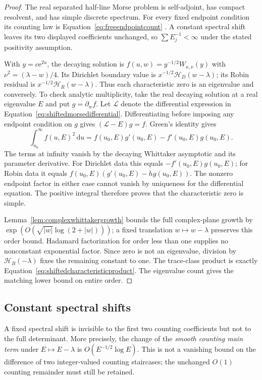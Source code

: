 \documentclass[11pt,letterpaper]{article}
\numberwithin{equation}{section}
\theoremstyle{definition}
\theoremstyle{remark}
\newcommand{\dd}{\,\mathrm d}
\newcommand{\e}{\mathrm e}
\begin{document}
\begin{proof}
The real separated half-line Morse problem is self-adjoint, has compact resolvent, and has simple discrete spectrum. For every fixed endpoint condition its counting law is Equation~\eqref{eq:freeendpointcount} \cite[Theorems~2.1 and 3.2]{lagarias}. A constant spectral shift leaves its two displayed coefficients unchanged, so $\sum E_j^{-1}<\infty$ under the stated positivity assumption.

With $y=c\e^{2u}$, the decaying solution is
$f(u,w)=y^{-1/2}W_{\kappa,\nu}(y)$ with $\nu^2=(\lambda-w)/4$.
Its Dirichlet boundary value is $x^{-1/2}\mathcal H_D(w-\lambda)$; its Robin residual is
$x^{-1/2}\mathcal H_R(w-\lambda)$. Thus each characteristic zero is an eigenvalue and conversely. To check analytic multiplicity, take the real decaying solution at a real eigenvalue $E$ and put $g=\partial_w f$. Let $\mathcal L$ denote the differential expression in Equation~\eqref{eq:shiftedmorsedifferential}. Differentiating before imposing any endpoint condition on $g$ gives $(\mathcal L-E)g=f$. Green's identity gives
\begin{equation}
 \int_{u_0}^{\infty} f(u,E)^2\dd u
 = f(u_0,E)g'(u_0,E)-f'(u_0,E)g(u_0,E).
 \label{eq:robinmultiplicity}
\end{equation}
The terms at infinity vanish by the decaying Whittaker asymptotic and its parameter derivative. For Dirichlet data this equals $-f'(u_0,E)g(u_0,E)$; for Robin data it equals $f(u_0,E)(g'(u_0,E)-hg(u_0,E))$. The nonzero endpoint factor in either case cannot vanish by uniqueness for the differential equation. The positive integral therefore proves that the characteristic zero is simple.

Lemma~\ref{lem:complexwhittakergrowth} bounds the full complex-plane growth by
$\exp(O(\sqrt{|w|}\log(2+|w|)))$; a fixed translation $w\mapsto w-\lambda$ preserves this order bound. Hadamard factorization for order less than one supplies no nonconstant exponential factor. Since zero is not an eigenvalue, division by $\mathcal H_B(-\lambda)$ fixes the remaining constant to one. The trace-class product is exactly Equation~\eqref{eq:shiftedcharacteristicproduct}. The eigenvalue count gives the matching lower bound on entire order.
\end{proof}

\subsection{Constant spectral shifts}
\label{subsec:constantshift}
A fixed spectral shift is invisible to the first two counting coefficients but not to the full determinant. More precisely, the change of the \emph{smooth counting main term} under $E\mapsto E-\lambda$ is $O(E^{-1/2}\log E)$. This is not a vanishing bound on the difference of two integer-valued counting staircases; the unchanged $O(1)$ counting remainder must still be retained.
\end{document}
